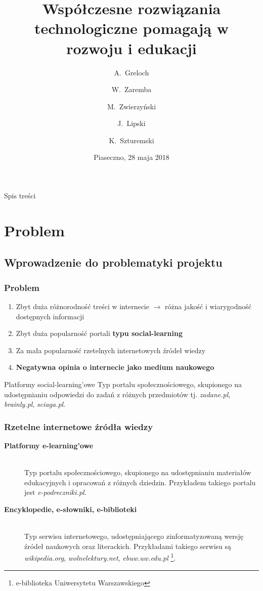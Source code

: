 \documentclass[10pt]{beamer}
\title[]
{
  Współczesne rozwiązania technologiczne pomagają w rozwoju i edukacji
}
\author[A.~Greloch \and W.~Zaremba \and M.~Zwierzyński \and J.~Lipski \and K.~Szturemski]
{
  A.~Greloch \and W.~Zaremba \and M.~Zwierzyński \and J.~Lipski \and K.~Szturemski
}
\institute[G1PIA]
{
  Klasa 3j\\
  Gimnazjum nr. 1 im. Powstańców Warszawy w Piasecznie
}
\date
{
  Piaseczno, 28 maja 2018
}
\begin{document}
\frame{\titlepage}

\begin{frame}{Spis treści}
\tableofcontents
\end{frame}

\section{Problem}
\subsection{Wprowadzenie do problematyki projektu}

\begin{frame}
  \frametitle{Problem}
  \begin{enumerate}
    \item Zbyt duża różnorodność treści w internecie $\rightarrow$ różna jakość i wiarygodność dostępnych informacji
    \item Zbyt duża popularność portali \textbf{typu social-learning}
    \item Za mała popularność rzetelnych internetowych źródeł wiedzy
    \item \textbf{Negatywna opinia o internecie jako medium naukowego}
  \end{enumerate}
  \begin{block}{Platformy social-learning'owe}
    Typ portalu społecznościowego, skupionego na udostępnianiu odpowiedzi do zadań z różnych przedmiotów tj. \emph{zadane.pl}, \emph{brainly.pl}, \emph{sciaga.pl}.
  \end{block}
\end{frame}

\begin{frame}
  \frametitle{Rzetelne internetowe źródła wiedzy}
  \small

  \begin{description}
    \item [\textbf{Platformy e-learning'owe}]\hfill\\ Typ portalu społecznościowego, skupionego na udostępnianiu materiałów edukacyjnych i opracowań z różnych dziedzin. Przykładem takiego portalu jest \emph{e-podreczniki.pl}.
    \item [\textbf{Encyklopedie, e-słowniki, e-biblioteki}]\hfill\\ Typ serwisu internetowego, udostępniającego zinformatyzowaną wersję źródeł naukowych oraz literackich. Przykładami takiego serwisu są \emph{wikipedia.org}, \emph{wolnelektury.net}, \emph{ebuw.uw.edu.pl} \footnote[frame]{e-biblioteka Uniwersytetu Warszawskiego}.
  \end{description}

\end{frame}
\end{document}
